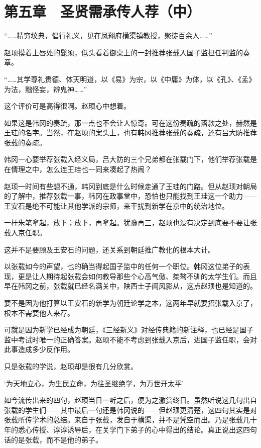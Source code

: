\section{第五章　圣贤需承传人荐（中）}

“……精穷坟典，倡行礼义，见在凤翔府横渠镇教授，聚徒百余人……”

赵顼摸着上唇处的髭须，低头看着御桌上的一封推荐张载入国子监担任判监的奏章。

“……其学尊礼贵德、体天明道，以《易》为宗，以《中庸》为体，以《孔》、《孟》为法，黜怪妄，辨鬼神……”

这个评价可是高得很啊。赵顼心中想着。

如果这是韩冈的奏疏，那一点也不会让人惊奇。可在这份奏疏的落款之处，赫然是王珪的名字。当然，在赵顼的案头上，也有韩冈推荐张载的奏疏，还有吕大防推荐张载的奏疏。

韩冈一心要举荐张载入经义局，吕大防的三个兄弟都在张载门下，他们举荐张载是在情理之中，怎么连王珪也一同来凑起了热闹？

赵顼一时间有些想不通，韩冈到底是什么时候走通了王珪的门路。但从赵顼对朝局的了解中，推荐张载一事，韩冈在政事堂中，恐怕也只能找到王珪这一个助力——王安石是绝不可能让其他学派的宗师，来干扰到新学在京中的统治地位。

一杆朱笔拿起，放下；放下，再拿起。犹豫再三，赵顼也没有决定到底要不要让张载入京任职。

这并不是要顾及王安石的问题，还关系到朝廷推广教化的根本大计。

以张载如今的声望，也的确当得起国子监中的任何一个职位。韩冈这位弟子的表现，更是让人期待起张载会如何教导那些个心高气傲、桀骜不驯的太学生们。而且早在韩冈之前，张载就已经名满关中，陕西士子闻风影从，这点赵顼也是知道的。

要不是因为他打算以王安石的新学为朝廷论学之本，这两年早就要招张载入京了，根本不需要他人来荐。

可就是因为新学已经成为朝廷，《三经新义》对经传典籍的新注释，也已经是国子监中考试时唯一的正确答案。赵顼不能不考虑到张载入京后，进国子监任职，会对此事造成多少反作用。

只是张载的学说，赵顼却是很有几分欣赏。

‘为天地立心，为生民立命，为往圣继绝学，为万世开太平’

如今流传出来的四句，赵顼当日一听之后，便为之激赏终日。虽然听说这几句出自张载的学生们——其中最后一句还是韩冈说的——但赵顼更清楚，这四句其实是对张载所传学术的总结。来自于张载，发自于横渠，并不是凭空而出。乃是张载几十年的悉心传授、谆谆诱导后，在关学门下弟子的心中得出的结论。真正说出这四句话的是张载，而不是他的弟子。

